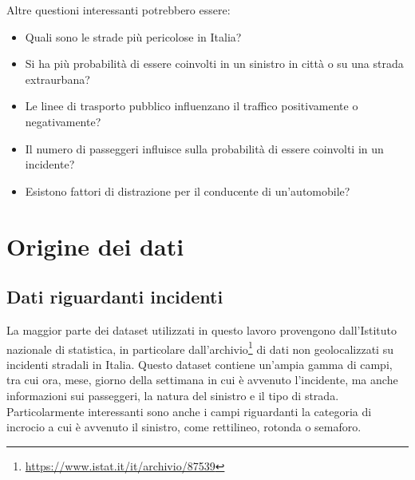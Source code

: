 \documentclass[a4paper,12pt]{report}
\begin{document}
Altre questioni interessanti potrebbero essere:
\begin{itemize}
    \item Quali sono le strade più pericolose in Italia?
    \item Si ha più probabilità di essere coinvolti in un sinistro in città o su una strada extraurbana? 
    \item Le linee di trasporto pubblico influenzano il traffico positivamente o negativamente?
    \item Il numero di passeggeri influisce sulla probabilità di essere coinvolti in un incidente? 
    \item Esistono fattori di distrazione per il conducente di un'automobile? 
\end{itemize}

\chapter{Origine dei dati}

\section{Dati riguardanti incidenti}

La maggior parte dei dataset utilizzati in questo lavoro 
provengono dall'Istituto nazionale di statistica, in particolare 
dall'archivio\footnote{\url{https://www.istat.it/it/archivio/87539}}
di dati non geolocalizzati su incidenti stradali in Italia. 
Questo dataset contiene un'ampia gamma di campi, tra cui ora, 
mese, giorno della settimana in cui è avvenuto l'incidente, 
ma anche informazioni sui passeggeri, la natura del sinistro e il tipo di strada. 
Particolarmente interessanti sono anche i campi riguardanti la categoria di incrocio 
a cui è avvenuto il sinistro, come rettilineo, rotonda o semaforo. 
\end{document}
